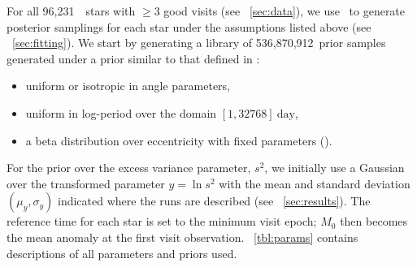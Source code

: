 \documentclass[modern, letterpaper]{aastex62}
\newcommand{\apogee}{\project{\acronym{APOGEE}}}
\newcommand{\thejoker}{\project{The~Joker}}
\newcommand{\nprior}{536,870,912}
\newcommand{\nstars}{96,231}
\begin{document}
For all \nstars\ \apogee\ stars with $\geq 3$ good visits (see
\sectionname~\ref{sec:data}), we use \thejoker\ to generate posterior samplings
for each star under the assumptions listed above (see
\sectionname~\ref{sec:fitting}).
We start by generating a library of \nprior\ prior samples generated under a
prior similar to that defined in \citet{Price-Whelan:2017}:
\begin{itemize}
    \item uniform or isotropic in angle parameters,
    \item uniform in log-period over the domain $[1,32768]~\textrm{day}$,
    \item a beta distribution over eccentricity with fixed parameters (\citealt{Kipping:2013}).
\end{itemize}
For the prior over the excess variance parameter, $s^2$, we initially use
a Gaussian over the transformed parameter $y = \ln s^2$ with the mean and
standard deviation $(\mu_y, \sigma_y)$ indicated where the runs are described
(see \sectionname~\ref{sec:results}).
The reference time for each star is set to the minimum visit epoch; $M_0$ then
becomes the mean anomaly at the first visit observation.
\tablename~\ref{tbl:params} contains descriptions of all parameters and priors
used.
\end{document}
